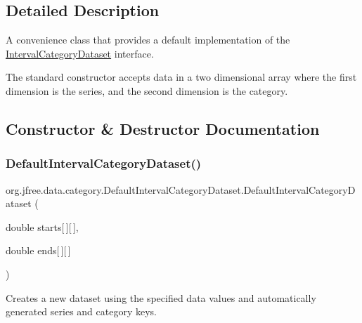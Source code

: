 \subsection{Detailed Description}
A convenience class that provides a default implementation of the \mbox{\hyperlink{interfaceorg_1_1jfree_1_1data_1_1category_1_1_interval_category_dataset}{Interval\+Category\+Dataset}} interface. 

The standard constructor accepts data in a two dimensional array where the first dimension is the series, and the second dimension is the category. 

\subsection{Constructor \& Destructor Documentation}
\mbox{\label{classorg_1_1jfree_1_1data_1_1category_1_1_default_interval_category_dataset_adb601ae0645988be67a5eab831434621}} 
\subsubsection{\texorpdfstring{Default\+Interval\+Category\+Dataset()}{DefaultIntervalCategoryDataset()}\hspace{0.1cm}{\footnotesize\ttfamily [1/4]}}
{\footnotesize\ttfamily org.\+jfree.\+data.\+category.\+Default\+Interval\+Category\+Dataset.\+Default\+Interval\+Category\+Dataset (\begin{DoxyParamCaption}\item[{double}]{starts\mbox{[}$\,$\mbox{]}\mbox{[}$\,$\mbox{]},  }\item[{double}]{ends\mbox{[}$\,$\mbox{]}\mbox{[}$\,$\mbox{]} }\end{DoxyParamCaption})}

Creates a new dataset using the specified data values and automatically generated series and category keys.


